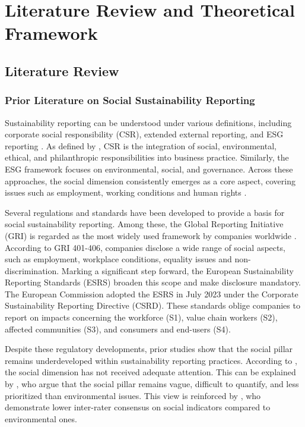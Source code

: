 \chapter{Literature Review and Theoretical Framework}
\label{chap:background}
\section{Literature Review}
\subsection{Prior Literature on Social Sustainability Reporting}

Sustainability reporting can be understood under various definitions, 
including corporate social responsibility (CSR), extended external reporting, 
and ESG reporting \parencite{Edge2022}. As defined by \parencite{Rasche2017}, CSR is the integration of social, 
environmental, ethical, and philanthropic responsibilities into business practice. 
Similarly, the ESG framework focuses on environmental, social, and governance. 
Across these approaches, the social dimension consistently emerges as a core aspect,
covering issues such as employment, working conditions and human rights \parencite{Fiechter2022, Morais2018}.

Several regulations and standards have been developed to provide a basis for social sustainability reporting.
Among these, the Global Reporting Initiative (GRI) is regarded as the most widely used framework 
by companies worldwide \parencite{Bais2024, vanOorschot2024}. 
According to GRI 401-406, companies disclose a wide range of social aspects, such as employment,
workplace conditions, equality issues and non-discrimination.
Marking a significant step forward, the European Sustainability Reporting Standards (ESRS) 
broaden this scope and make disclosure mandatory. The European Commission adopted the ESRS 
in July 2023 under the Corporate Sustainability Reporting Directive (CSRD). These standards 
oblige companies to report on impacts concerning the workforce (S1), value chain workers (S2), 
affected communities (S3), and consumers and end-users (S4).

Despite these regulatory developments, prior studies show that the social pillar remains underdeveloped 
within sustainability reporting practices. According to \textcite{Heldal2024}, the social dimension 
has not received adequate attention. This can be explained by \textcite{Morais2018}, 
who argue that the social pillar remains vague, difficult to quantify, and less prioritized than 
environmental issues. This view is reinforced by \textcite{Berg2022}, who demonstrate lower inter-rater 
consensus on social indicators compared to environmental ones.

